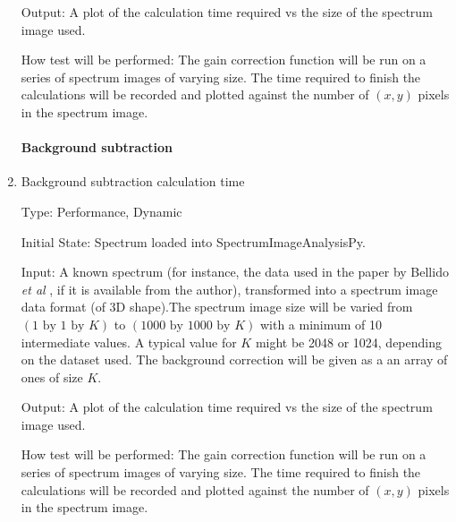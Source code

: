 \documentclass[12pt, titlepage]{article}
\newcommand{\progname}{SpectrumImageAnalysisPy}
\begin{document}
\begin{enumerate}
Output: A plot of the calculation time required vs the size of the spectrum
image used.

How test will be performed: The gain correction function will be run on a series
of spectrum images of varying size. The time required to finish the calculations
will be recorded and plotted against the number of $(x, y)$ pixels in the
spectrum image.\\

\paragraph{Background subtraction}
\item{Background subtraction calculation time}

Type: Performance, Dynamic

Initial State: Spectrum loaded into \progname{}.

Input: A known spectrum (for instance, the data used in the paper by Bellido
\textit{et al} \cite{bellido_toward_2014}, if it is available from the author),
transformed into a spectrum image data format (of 3D shape).The spectrum image
size will be varied from $(1\text{ by }1\text{ by }K)$ to $(1000 \text{ by }
1000 \text{ by }K)$ with a minimum of 10 intermediate values. A typical value
for $K$ might be 2048 or 1024, depending on the dataset used. The background
correction will be given as a an array of ones of size $K$.

Output: A plot of the calculation time required vs the size of the spectrum
image used.

How test will be performed: The gain correction function will be run on a series
of spectrum images of varying size. The time required to finish the calculations
will be recorded and plotted against the number of $(x, y)$ pixels in the
spectrum image.\\

\end{enumerate}
\end{document}
